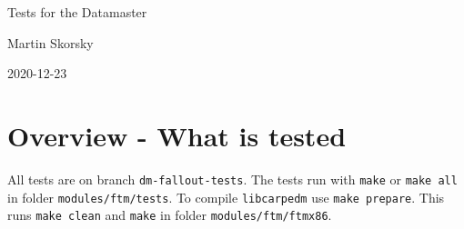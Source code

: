 \documentclass[12pt,a4paper]{report}
\begin{document}
\begin{titlepage}
\vspace{2cm}
\begin{center}
\Huge{Tests for the Datamaster}

\Large{Martin Skorsky}

\Large{2020-12-23}
\end{center}
\vfill
\end{titlepage}

\tableofcontents

\chapter{Overview - What is tested}
All tests are on branch \texttt{dm-fallout-tests}. The tests run with \texttt{make} or \texttt{make all} in folder \texttt{modules/ftm/tests}. 
To compile \texttt{libcarpedm} use \texttt{make prepare}. This runs \texttt{make clean} and \texttt{make} in folder \texttt{modules/ftm/ftmx86}.
\end{document}

